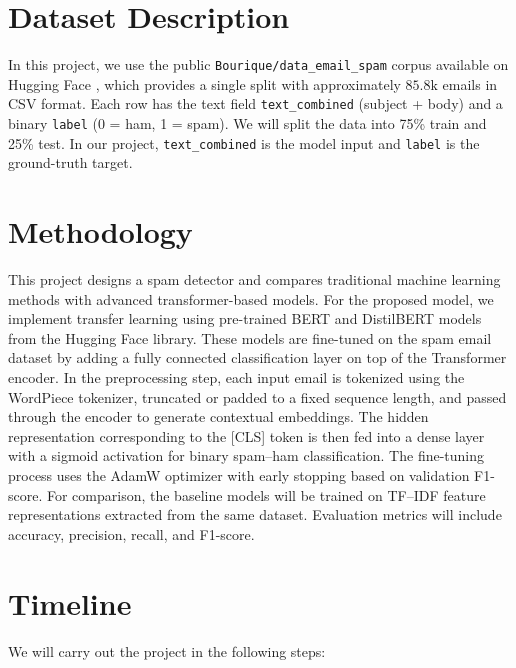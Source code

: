 \documentclass[12pt]{article}
\begin{document}
\section{Dataset Description}
In this project, we use the public \texttt{Bourique/data\_email\_spam} corpus available on Hugging Face \cite{huggingface_dataset}, which provides a single split with approximately $ 85.8\text{k}$ emails in CSV format. Each row has the text field \texttt{text\_combined} (subject + body) and a binary \texttt{label} (0 = ham, 1 = spam). We will split the data into 75\% train and 25\% test. In our project, \texttt{text\_combined} is the model input and \texttt{label} is the ground-truth target.

\section{ Methodology}
This project designs a spam detector and compares traditional machine learning methods with advanced transformer-based models. For the proposed model, we implement transfer learning using pre-trained BERT and DistilBERT models from the Hugging Face library. These models are fine-tuned on the spam email dataset by adding a fully connected classification layer on top of the Transformer encoder. In the preprocessing step, each input email is tokenized using the WordPiece tokenizer, truncated or padded to a fixed sequence length, and passed through the encoder to generate contextual embeddings. The hidden representation corresponding to the [CLS] token is then fed into a dense layer with a sigmoid activation for binary spam–ham classification.
The fine-tuning process uses the AdamW optimizer with early stopping based on validation F1-score. For comparison, the baseline models will be trained on TF–IDF feature representations extracted from the same dataset. Evaluation metrics will include accuracy, precision, recall, and F1-score.


\section{Timeline}
We will carry out the project in the following steps:
\end{document}
